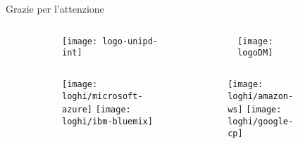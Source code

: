 %
\nonumber
\begin{frame}{Grazie per l'attenzione}
\begin{figure}[f]
\centering
	\vspace{10px}
	\begin{columns}
		\begin{column}{0.5\paperwidth}
			\begin{figure}[!h]
			\texttt{[image: logo-unipd-int]}
			\end{figure}
		\end{column}
		\begin{column}{0.5\textwidth}
			\begin{figure}[!h]
			\texttt{[image: logoDM]}
			\end{figure}
		\end{column}
	\end{columns}
	\vspace{10px}
	\begin{columns}
		\begin{column}{0.5\paperwidth}
			\begin{figure}[!h]
				\texttt{[image: loghi/microsoft-azure]}
				\vfill
				\vspace{10px}
				\texttt{[image: loghi/ibm-bluemix]}
			\end{figure}
		\end{column}
		\begin{column}{0.5\textwidth}
			\begin{figure}[!h]
				\texttt{[image: loghi/amazon-ws]}
				\vfill
				\vspace{10px}
				\texttt{[image: loghi/google-cp]}
			\end{figure}
		\end{column}
	\end{columns}
\end{figure}
\end{frame}
%
